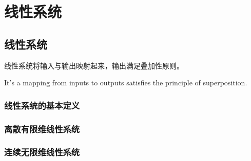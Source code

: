 \chapter{线性系统}
\section{线性系统}
线性系统将输入与输出映射起来，输出满足叠加性原则。

It's a mapping from inputs to outputs satisfies the principle of superposition.
\subsection{线性系统的基本定义}
\subsection{离散有限维线性系统}
\subsection{连续无限维线性系统}